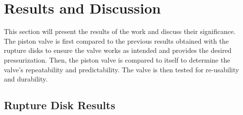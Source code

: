 \section{Results and Discussion} \label{s:results}
This section will present the results of the work and discuss their significance. The piston valve is first compared to the previous results obtained with the rupture disks to ensure the valve works as intended and provides the desired pressurization. Then, the piston valve is compared to itself to determine the valve's repeatability and predictability. The valve is then tested for re-usability and durability.

\subsection{Rupture Disk Results}

